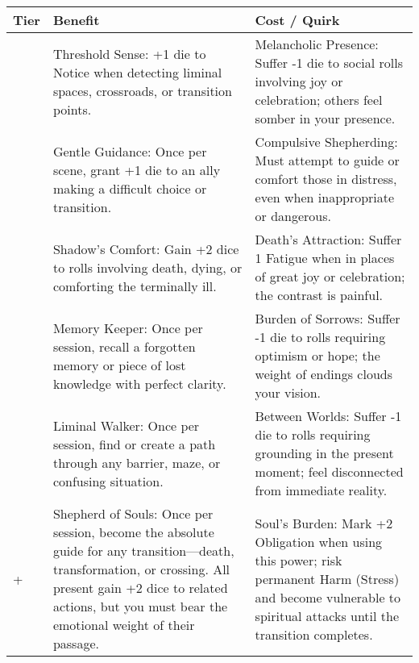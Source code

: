 \begin{longtable}{>{\raggedright\arraybackslash}p{1cm} p{5cm} p{5cm}}
\toprule
\textbf{Tier} & \textbf{Benefit} & \textbf{Cost / Quirk} \\
\midrule
1 & Threshold Sense: +1 die to Notice when detecting liminal spaces, crossroads, or transition points. & Melancholic Presence: Suffer -1 die to social rolls involving joy or celebration; others feel somber in your presence. \\
\midrule
2 & Gentle Guidance: Once per scene, grant +1 die to an ally making a difficult choice or transition. & Compulsive Shepherding: Must attempt to guide or comfort those in distress, even when inappropriate or dangerous. \\
\midrule
3 & Shadow's Comfort: Gain +2 dice to rolls involving death, dying, or comforting the terminally ill. & Death's Attraction: Suffer 1 Fatigue when in places of great joy or celebration; the contrast is painful. \\
\midrule
4 & Memory Keeper: Once per session, recall a forgotten memory or piece of lost knowledge with perfect clarity. & Burden of Sorrows: Suffer -1 die to rolls requiring optimism or hope; the weight of endings clouds your vision. \\
\midrule
5 & Liminal Walker: Once per session, find or create a path through any barrier, maze, or confusing situation. & Between Worlds: Suffer -1 die to rolls requiring grounding in the present moment; feel disconnected from immediate reality. \\
\midrule
6+ & Shepherd of Souls: Once per session, become the absolute guide for any transition—death, transformation, or crossing. All present gain +2 dice to related actions, but you must bear the emotional weight of their passage. & Soul's Burden: Mark +2 Obligation when using this power; risk permanent Harm (Stress) and become vulnerable to spiritual attacks until the transition completes. \\
\bottomrule
\end{longtable}